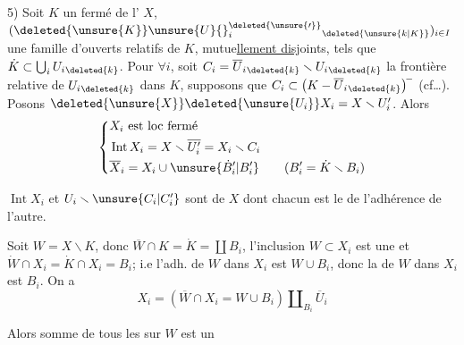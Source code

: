 
5) Soit $K$ un fermé de l' $X$, $(\deleted{\unsure{K}}\unsure{U}{}^{\deleted{\unsure{\prime}}}_i{}_{\deleted{\unsure{k|K}}})_{i\in I}$ une famille d'ouverts relatifs de $K$, mutue\uline{llement disj}oints, tels que $\dot K\subset\bigcup_i U_i{}_{\deleted{k}}$.   Pour $\forall i$, soit $C_i=\overline U_i{}_{\deleted{k}}\smallsetminus U_i{}_{\deleted{k}}$ la frontière relative de $U_i{}_{\deleted{k}}$ dans $K$, supposons que $C_i\subset\bigl(K-\overline U_i{}_{\deleted{k}}\bigr)^{\! -}$ (cf\ldots). Posons $\deleted{\unsure{X}}\deleted{\unsure{U_i}}X_i=X\smallsetminus U'_i$. Alors
\[
\left\{\begin{aligned}
&X_i\ \text{est loc fermé}\\
&\operatorname{Int}X_i=X\smallsetminus\overline{U'_i}=X_i\smallsetminus C_i\\
&\overline X_i=X_i\cup \unsure{\dot B'_i|B'_i}\qquad(B'_i=\dot K\smallsetminus B_i)
\end{aligned}\right.
\]

$\operatorname{Int}X_i$ et \uline{$U_i\smallsetminus \unsure{C_i|C'_i}$} sont   de $X$ dont chacun est le  de l'adhérence de l'autre.

Soit $W=X\smallsetminus K$,  donc  $\overline W\cap K=\dot K=\coprod B_i$, l'inclusion $W\subset X_i$ est une   et $\dot W\cap X_i=\dot K\cap X_i=B_i$;  i.e  l'adh. de $W$ dans $X_i$ est $W\cup B_i$, donc la  de $W$ dans $X_i$ est $B_i$. On a
\[
X_i=(\overline W\cap X_i=W\cup B_i)\amalg_{B_i}\overline U_i
\]


Alors  somme  de tous les  sur $W$ est un 
